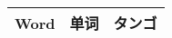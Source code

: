 \documentclass[10pt]{article} %
\begin{document}
\begin{multicols}{2} %

\begin{tabular}{@{}p{}@{}p{}@{} p{}@{}}
\toprule %
Word & 单词 & タンゴ \\ \midrule
\bottomrule %
\end{tabular}


\end{multicols}
\end{document}
